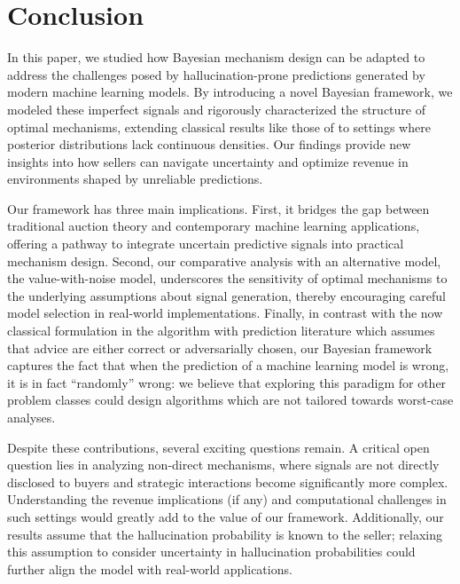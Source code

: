 \section{Conclusion}


In this paper, we studied how Bayesian mechanism design can be adapted to address the challenges posed by hallucination-prone predictions generated by modern machine learning models. By introducing a novel Bayesian framework, we modeled these imperfect signals and rigorously characterized the structure of optimal mechanisms, extending classical results like those of \citet{myerson1981optimal} to settings where posterior distributions lack continuous densities. Our findings provide new insights into how sellers can navigate uncertainty and optimize revenue in environments shaped by unreliable predictions.

Our framework has three main implications.  First, it bridges the gap between traditional auction theory and contemporary machine learning applications, offering a pathway to integrate uncertain predictive signals into practical mechanism design. Second, our comparative analysis with an alternative model, the value-with-noise model, underscores the sensitivity of optimal mechanisms to the underlying assumptions about signal generation, thereby encouraging careful model selection in real-world implementations. Finally, in contrast with the now classical formulation in the algorithm with prediction literature which assumes that advice are either correct or adversarially chosen, our Bayesian framework captures the fact that when the prediction of a machine learning model is wrong, it is in fact ``randomly'' wrong: we believe that exploring this paradigm for other problem classes could design algorithms which are not tailored towards worst-case analyses. 

Despite these contributions, several exciting questions remain. A critical open question lies in analyzing non-direct mechanisms, where signals are not directly disclosed to buyers and strategic interactions become significantly more complex. Understanding the revenue implications (if any) and computational challenges in such settings would greatly add to the value of our framework. Additionally, our results assume that the hallucination probability is known to the seller; relaxing this assumption to consider uncertainty in hallucination probabilities could further align the model with real-world applications. 